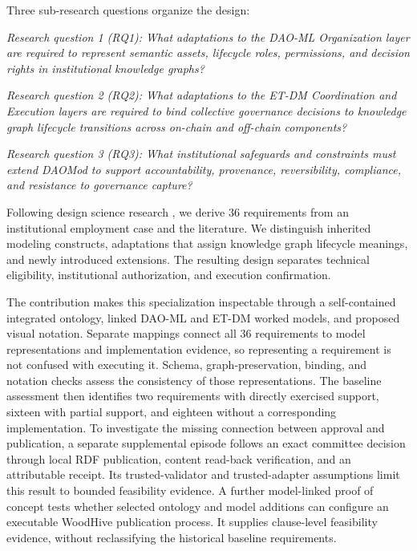 \documentclass[journal]{IEEEtran}
\begin{document}
Three sub-research questions organize the design:

\emph{Research question 1 (RQ1): What adaptations to the DAO-ML
Organization layer are required to represent semantic assets,
lifecycle roles, permissions, and decision rights in
institutional knowledge graphs?}

\emph{Research question 2 (RQ2): What adaptations to the ET-DM
Coordination and Execution layers are required to bind collective
governance decisions to knowledge graph lifecycle transitions
across on-chain and off-chain components?}

\emph{Research question 3 (RQ3): What institutional safeguards
and constraints must extend DAOMod to support accountability,
provenance, reversibility, compliance, and resistance to
governance capture?}

Following design science research \cite{hevner2004design},
we derive 36 requirements from an institutional employment
case and the literature. We distinguish inherited modeling
constructs, adaptations that assign knowledge graph lifecycle
meanings, and newly introduced extensions. The resulting
design separates technical eligibility, institutional
authorization, and execution confirmation.

The contribution makes this specialization inspectable through a
self-contained integrated ontology, linked DAO-ML and ET-DM worked
models, and proposed visual notation. Separate mappings connect all
36 requirements to model representations and implementation evidence,
so representing a requirement is not confused with executing it.
Schema, graph-preservation, binding, and notation checks assess the
consistency of those representations. The baseline assessment then
identifies two requirements with directly exercised support, sixteen
with partial support, and eighteen without a corresponding implementation.
To investigate the missing connection between approval and publication,
a separate supplemental episode follows an exact committee decision
through local RDF publication, content read-back verification, and an
attributable receipt. Its trusted-validator and trusted-adapter
assumptions limit this result to bounded feasibility evidence.
A further model-linked proof of concept tests whether selected
ontology and model additions can configure an executable WoodHive
publication process. It supplies clause-level feasibility evidence,
without reclassifying the historical baseline requirements.
\end{document}

